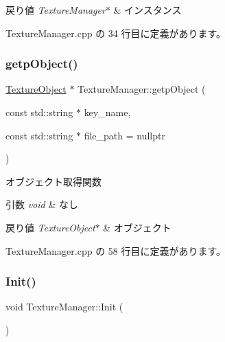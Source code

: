 \begin{DoxyRetVals}{戻り値}
{\em Texture\+Manager$\ast$} & インスタンス \\
\hline
\end{DoxyRetVals}


 Texture\+Manager.\+cpp の 34 行目に定義があります。

\mbox{\label{class_texture_manager_a8dc2cfb7e5d1a52b41401fed33342de0}} 
\subsubsection{\texorpdfstring{getp\+Object()}{getpObject()}}
{\footnotesize\ttfamily \mbox{\hyperlink{class_texture_object}{Texture\+Object}} $\ast$ Texture\+Manager\+::getp\+Object (\begin{DoxyParamCaption}\item[{const std\+::string $\ast$}]{key\+\_\+name,  }\item[{const std\+::string $\ast$}]{file\+\_\+path = {\ttfamily nullptr} }\end{DoxyParamCaption})}



オブジェクト取得関数 


\begin{DoxyParams}{引数}
{\em void} & なし \\
\hline
\end{DoxyParams}

\begin{DoxyRetVals}{戻り値}
{\em Texture\+Object$\ast$} & オブジェクト \\
\hline
\end{DoxyRetVals}


 Texture\+Manager.\+cpp の 58 行目に定義があります。

\mbox{\label{class_texture_manager_a7ebc403618f25c44a44c74cc04690502}} 
\subsubsection{\texorpdfstring{Init()}{Init()}}
{\footnotesize\ttfamily void Texture\+Manager\+::\+Init (\begin{DoxyParamCaption}{ }\end{DoxyParamCaption})}



